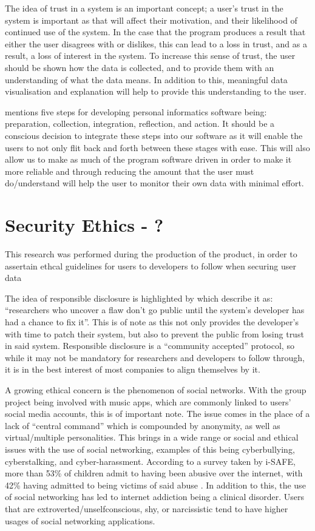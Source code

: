 \documentclass[11pt]{report}
\begin{document}
The idea of trust in a system is an important concept; a user’s trust in the system is important as that will affect their motivation, and their likelihood of continued use of the system. In the case that the program produces a result that either the user disagrees with or dislikes, this can lead to a loss in trust, and as a result, a loss of interest in the system. To increase this sense of trust, the user should be shown how the data is collected, and to provide them with an understanding of what the data means. In addition to this, meaningful data visualisation and explanation will help to provide this understanding to the user. \cite{Jaimes2013}

\cite{Li2010} mentions five steps for developing personal informatics software being: preparation, collection, integration, reflection, and action.  It should be a conscious decision to integrate these steps into our software as it will enable the users to not only flit back and forth between these stages with ease. This will also allow us to make as much of the program software driven in order to make it more reliable and through reducing the amount that the user must do/understand will help the user to monitor their own data with minimal effort.

\section{Security Ethics - ?}

This research was performed during the production of the product, in order to assertain ethcal guidelines for users to developers to follow when securing user data\newline

The idea of responsible disclosure is highlighted by \cite{2010a} which describe it as: “researchers who uncover a flaw don't go public until the system's developer has had a chance to fix it”.  This is of note as this not only provides the developer’s with time to patch their system, but also to prevent the public from losing trust in said system.  Responsible disclosure is a “community accepted” protocol, so while it may not be mandatory for researchers and developers to follow through, it is in the best interest of most companies to align themselves by it.

A growing ethical concern is the phenomenon of social networks.  With the group project being involved with music apps, which are commonly linked to users’ social media accounts, this is of important note.  The issue comes in the place of a lack of “central command” which is compounded by anonymity, as well as virtual/multiple personalities.  This brings in a wide range or social and ethical issues with the use of social networking, examples of this being cyberbullying, cyberstalking, and cyber-harassment.  According to a survey taken by i-SAFE, more than 53\% of children admit to having been abusive over the internet, with 42\% having admitted to being victims of said abuse \cite{iSAFE2004}. In addition to this, the use of social networking has led to internet addiction being a clinical disorder.  Users that are extroverted/unselfconscious, shy, or narcissistic \cite{Kizza2016} tend to have higher usages of social networking applications.  
\end{document}
